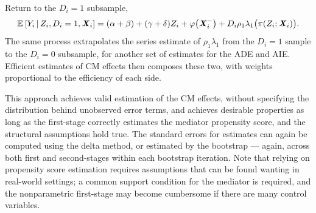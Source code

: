 Return to the $D_i = 1$ subsample,
\[ \mathbb{E}_{} \left[ Y_i \, \middle\vert \, Z_i, D_i = 1, \boldsymbol{\mathit{X}}_i \right] =
    (\alpha + \beta) + (\gamma + \delta) Z_i + \varphi\big( \boldsymbol{\mathit{X}}_i^- \big)
    +  D_i \rho_1 \lambda_1 \big( \pi(Z_i ; \boldsymbol{\mathit{X}}_i) \big). \]
The same process extrapolates the series estimate of $\rho_1 \lambda_1$ from the $D_i =1$ sample to the $D_i = 0$ subsample, for another set of estimates for the ADE and AIE.
Efficient estimates of CM effects then composes these two, with weights proportional to the efficiency of each side.

This approach achieves valid estimation of the CM effects, without specifying the distribution behind unobserved error terms, and achieves desirable properties as long as the first-stage correctly estimates the mediator propensity score, and the structural assumptions hold true.
The standard errors for estimates can again be computed using the delta method, or estimated by the bootstrap --- again, across both first and second-stages within each bootstrap iteration.
Note that relying on propensity score estimation requires assumptions that can be found wanting in real-world settings; a common support condition for the mediator is required, and the nonparametric first-stage may become cumbersome if there are many control variables.


%
%

